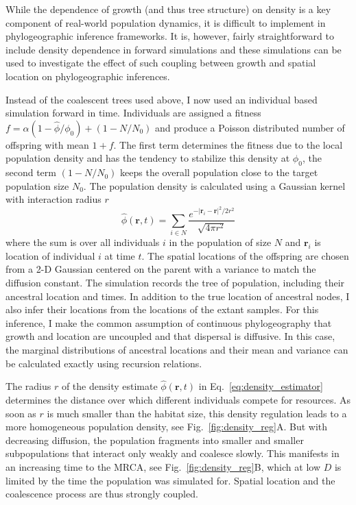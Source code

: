 \documentclass[aps,rmp, twocolumn]{revtex4}
\newcommand{\rvec}{\mathbf{r}}
\begin{document}
While the dependence of growth (and thus tree structure) on density is a key component of real-world population dynamics, it is difficult to implement in phylogeographic inference frameworks.
It is, however, fairly straightforward to include density dependence in forward simulations and these simulations can be used to investigate the effect of such coupling between growth and spatial location on phylogeographic inferences.

Instead of the coalescent trees used above, I now used an individual based simulation forward in time.
Individuals are assigned a fitness $f=\alpha(1-\hat{\phi}/\phi_0) + (1-N/N_0)$ and produce a Poisson distributed number of offspring with mean $1+f$.
The first term determines the fitness due to the local population density and has the tendency to stabilize this density at $\phi_0$, the second term $(1-N/N_0)$ keeps the overall population close to the target population size $N_0$.
The population density is calculated using a Gaussian kernel with interaction radius $r$
\begin{equation}
    \label{eq:density_estimator}
    \hat{\phi}(\rvec, t) = \sum_{i\in N} \frac{e^{-|\rvec_i - \rvec|^2/2r^2}}{\sqrt{4\pi r^2}}
\end{equation}
where the sum is over all individuals $i$ in the population of size $N$ and $\rvec_i$ is location of individual $i$ at time $t$.
The spatial locations of the offspring are chosen from a 2-D Gaussian centered on the parent with a variance to match the diffusion constant.
The simulation records the tree of population, including their ancestral location and times.
In addition to the true location of ancestral nodes, I also infer their locations from the locations of the extant samples.
For this inference, I make the common assumption of continuous phylogeography that growth and location are uncoupled and that dispersal is diffusive.
In this case, the marginal distributions of ancestral locations and their mean and variance can be calculated exactly using recursion relations.

The radius $r$ of the density estimate $\hat{\phi}(\rvec, t)$ in Eq.~\ref{eq:density_estimator} determines the distance over which different individuals compete for resources.
As soon as $r$ is much smaller than the habitat size, this density regulation leads to a more homogeneous population density, see Fig.~\ref{fig:density_reg}A.
But with decreasing diffusion, the population fragments into smaller and smaller subpopulations that interact only weakly and coalesce slowly.
This manifests in an increasing time to the MRCA, see Fig.~\ref{fig:density_reg}B, which at low $D$ is limited by the time the population was simulated for.
Spatial location and the coalescence process are thus strongly coupled.
\end{document}
